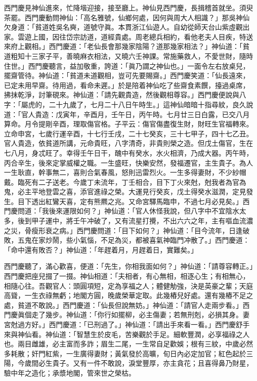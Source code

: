 西門慶見神仙進來，忙降堦迎接，接至廳上。神仙見西門慶，長揖稽首就坐。須臾茶罷。西門慶動問神仙：「高名雅號，仙鄉何處，因何與周大人相識？」那吳神仙欠身道：「貧道姓吳名奭，道號守眞。本貫浙江仙遊人。自幼從師天台山紫虛觀出家。雲遊上國，因往岱宗訪道，道經貴處。周老總兵相約，看他老夫人目疾，特送來府上觀相。」西門慶道：「老仙長會那幾家陰陽？道那幾家相法？」神仙道：「貧道粗知十三家子平，善曉麻衣相法，又曉六壬神課。常施藥救人，不愛世財，隨時住世。」西門慶聽言，益加敬重，誇道：「眞乃謂之神仙也。」一面令左右放桌兒，擺齋管待。神仙道：「貧道未道觀相，豈可先要賜齋。」西門慶笑道：「仙長遠來，已定未用早齋。待用過，看命未遲。」於是陪着神仙吃了些齋食素饌，擡過桌席，拂抹乾淨，討筆硯來。神仙道：「請先觀貴造，然後觀相尊容。」{}西門慶便說與八字：「屬虎的，二十九歲了，七月二十八日午時生。」這神仙暗暗十指尋紋，良久說道：「官人貴造：戊寅年，辛酉月，壬午日，丙午時。七月廿三日白露，已交八月算命。月令提剛辛酉，理取傷官格。子平云：傷官傷盡復生財，財旺生官福轉來。立命申宮，七歲行運辛酉，十七行壬戌，二十七癸亥，三十七甲子，四十七乙丑。官人貴造，依貧道所講，元命貴旺，八字清奇，非貴則榮之造。但戊土傷官，生在七八月，身忒旺了。幸得壬午日干，醜中有癸水，水火相濟，乃成大器。丙午時，丙合辛生，後來定掌威權之職。一生盛旺，快樂安然，發福遷官，主生貴子。為人一生耿直，幹事無二，喜則合氣春風，怒則迅雷烈火。一生多得妻財，不少紗帽戴。{}臨死有二子送老。今歲丁未流年，丁壬相合，目下丁火來尅，尅我者為官為鬼，必主平地登雲之喜，添官進祿之榮。大運見行癸亥，戊土得癸水滋潤，定見發生。目下透出紅鸞天喜，定有熊羆之兆。又命宮驛馬臨申，不過七月必見矣。」西門慶問道：「我後來運限如何？」神仙道：「官人休怪我說，但八字中不宜陰水太多，後到甲子運中，將壬午冲破了，又有流星打攪，不出六六之年，主有嘔血流濃之災，骨瘦形衰之病。」西門慶問道：「目下如何？」神仙道：「目今流年，日逢破敗，五鬼在家炒鬧，些小氣惱，不足為災，都被喜氣神臨門冲散了。」西門慶道：「命中還有敗否？」神仙道：「年趕着月，月趕着日，實難矣。」

西門慶聽了，滿心歡喜，便道：「先生，你相我面如何？」神仙道：「請尊容轉正。」西門慶把座兒掇了一掇。神仙相道：「夫相者，有心無相，相逐心生；有相無心，相隨心往。吾觀官人：頭圓項短，定為享福之人；體健觔強，決是英豪之輩；天庭高聳，一生衣祿無虧；地閣方圓，晚歲榮華定取。此幾樁兒好處。還有幾樁不足之處，貧道不敢說。」西門慶道：「仙長但說無妨。」神仙道：「請官人走兩步看。」西門慶眞個走了幾步。神仙道：「你行如擺柳，必主傷妻；若無刑剋，必損其身。妻宮尅過方好。」西門慶道：「已刑過了。」神仙道：「請出手來看一看。」西門慶舒手來與神仙看。神仙道：「智慧生於皮毛，苦樂觀於手足。細軟豐潤，必享福祿之人也。兩目雌雄，必主富而多詐；眉生二尾，一生常自足歡娛；根有三紋，中歲必然多耗散；奸門紅紫，一生廣得妻財；黃氣發於高曠，旬日內必定加官；紅色起於三陽，今歲間必生貴子。又有一件不敢說，淚堂豐厚，亦主貪花；且喜得鼻乃財星，驗中年之造化；承漿地閣，管來世之榮枯。

